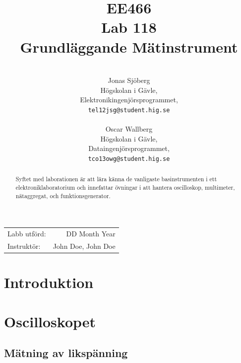 \documentclass[11pt,a4paper]{article}
\title{EE466 \\ Lab 118 \\ Grundläggande Mätinstrument}
\author{\\
  Jonas Sjöberg\\
  Högskolan i Gävle,\\
  Elektronikingenjörsprogrammet,\\
  \texttt{tel12jsg@student.hig.se}\\
  \\
  Oscar Wallberg\\
  Högskolan i Gävle,\\
  Dataingenjörsprogrammet,\\
  \texttt{tco13owg@student.hig.se}\\}
\date{}
\begin{document}
\maketitle

\begin{center}
\begin{tabular}{l r}
    Labb utförd: & DD Month Year \\
    Instruktör: & John Doe, John Doe
\end{tabular}
\end{center}

\begin{abstract}
    Syftet med laborationen är att lära känna de vanligaste basinstrumenten i
    ett elektroniklaboratorium och innefattar övningar i att hantera
    oscilloskop, multimeter, nätaggregat, och funktionsgenerator.
\end{abstract}

\newpage

{
    \setcounter{tocdepth}{3}
    \tableofcontents
}

\newpage

\section{Introduktion}\label{setup}

\section{Oscilloskopet}\label{}


\subsection{Mätning av likspänning}\label{meas_dc}
\end{document}
